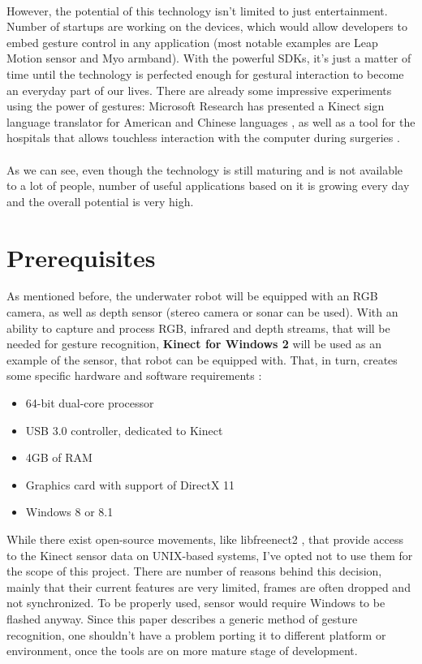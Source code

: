\documentclass[a4paper,11pt,oneside]{article}
\begin{document}
  \\
  However, the potential of this technology isn't limited to just entertainment. Number of startups are working on the devices, which would allow developers to embed gesture control in any application (most notable examples are Leap Motion sensor and Myo armband). With the powerful SDKs, it's just a matter of time until the technology is perfected enough for gestural interaction to become an everyday part of our lives. There are already some impressive experiments using the power of gestures: Microsoft Research has presented a Kinect sign language translator for American and Chinese languages \cite{MS02}, as well as a tool for the hospitals that allows touchless interaction with the computer during surgeries \cite{MS03}.\\
  \\
  As we can see, even though the technology is still maturing and is not available to a lot of people, number of useful applications based on it is growing every day and the overall potential is very high.
  

  \section{Prerequisites}
  
  As mentioned before, the underwater robot will be equipped with an RGB camera, as well as depth sensor (stereo camera or sonar can be used). With an ability to capture and process RGB, infrared and depth streams, that will be needed for gesture recognition, \textbf{Kinect for Windows 2} will be used as an example of the sensor, that robot can be equipped with. That, in turn, creates some specific hardware and software requirements \cite{MS01} :
  
  \begin{itemize}
  \item 64-bit dual-core processor
  \item USB 3.0 controller, dedicated to Kinect
  \item 4GB of RAM
  \item Graphics card with support of DirectX 11
  \item Windows 8 or 8.1
  \end{itemize}
  
  While there exist open-source movements, like libfreenect2 \cite{GH01}, that provide access to the Kinect sensor data on UNIX-based systems, I've opted not to use them for the scope of this project. There are number of reasons behind this decision, mainly that their current features are very limited, frames are often dropped and not synchronized. To be properly used, sensor would require Windows to be flashed anyway. Since this paper describes a generic method of gesture recognition, one shouldn't have a problem porting it to different platform or environment, once the tools are on more mature stage of development.
\end{document}
